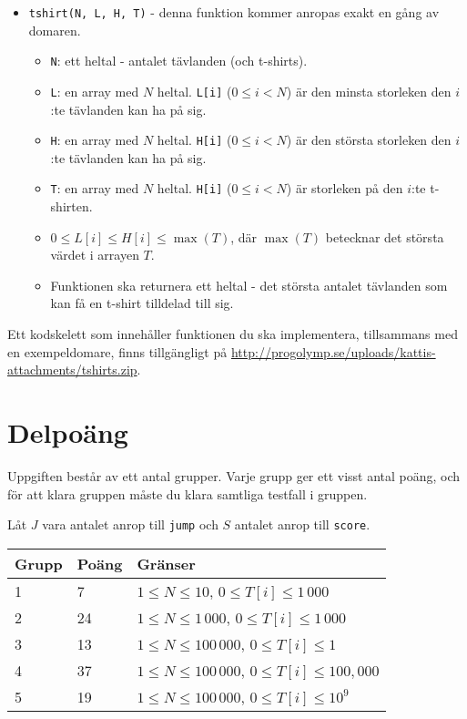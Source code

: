 \begin{itemize} 
  \item \texttt{tshirt(N, L, H, T)} - denna funktion kommer anropas exakt en gång av domaren.
  \begin{itemize}
    \item \texttt{N}: ett heltal - antalet tävlanden (och t-shirts).
    \item \texttt{L}: en array med $N$ heltal. \texttt{L[i]} ($0 \le i < N$) är den minsta storleken den $i$:te tävlanden kan ha på sig.
    \item \texttt{H}: en array med $N$ heltal. \texttt{H[i]} ($0 \le i < N$) är den största storleken den $i$:te tävlanden kan ha på sig.
    \item \texttt{T}: en array med $N$ heltal. \texttt{H[i]} ($0 \le i < N$) är storleken på den $i$:te t-shirten.
    \item $0 \le L[i] \le H[i] \le \max(T)$, där $\max(T)$ betecknar det största värdet i arrayen $T$.
    \item Funktionen ska returnera ett heltal - det största antalet tävlanden som kan få en t-shirt tilldelad till sig.
  \end{itemize}
\end{itemize}

Ett kodskelett som innehåller funktionen du ska implementera, tillsammans med en exempeldomare, finns tillgängligt på
\url{http://progolymp.se/uploads/kattis-attachments/tshirts.zip}.


\section*{Delpoäng}
Uppgiften består av ett antal grupper. Varje grupp ger ett visst antal poäng, och för att klara
gruppen måste du klara samtliga testfall i gruppen.

Låt $J$ vara antalet anrop till \texttt{jump} och $S$ antalet anrop till \texttt{score}.

\begin{tabular}{|l|l|l|}
  \hline
  \textbf{Grupp} & \textbf{Poäng} & \textbf{Gränser} \\ \hline
  1 & 7 & $1 \le N \le 10$, $0 \le T[i] \le 1\,000$ \\ \hline
  2 & 24 & $1 \le N \le 1\,000$, $0 \le T[i] \le 1\,000$ \\ \hline
  3 & 13 & $1 \le N \le 100\,000$, $0 \le T[i] \le 1$ \\ \hline
  4 & 37 & $1 \le N \le 100\,000$, $0 \le T[i] \le 100,000$ \\ \hline
  5 & 19 & $1 \le N \le 100\,000$, $0 \le T[i] \le 10^9$ \\ \hline
\end{tabular}


